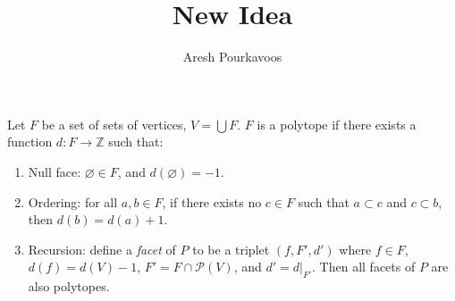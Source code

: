 \documentclass{article}
\begin{document}
\title{New Idea}
\author{Aresh Pourkavoos}
\maketitle

Let $F$ be a set of sets of vertices, $V = \bigcup F$.
$F$ is a polytope if there exists a function $d: F \rightarrow \mathbb{Z}$
such that:
\begin{enumerate}
\item
  Null face: $\varnothing \in F$, and $d(\varnothing)=-1$.
\item
  Ordering: for all $a, b \in F$,
  if there exists no $c \in F$ such that
  $a \subset c$ and $c \subset b$,
  then $d(b)=d(a)+1$.
\item
  Recursion: define a \textit{facet} of $P$ to be
  a triplet $(f, F', d')$ where
  $f \in F$, $d(f) = d(V)-1$,
  $F' = F \cap \mathscr{P}(V)$, and
  $d' = d{\big |}_{F'}$.
  Then all facets of $P$ are also polytopes.
\end{enumerate}
\end{document}

